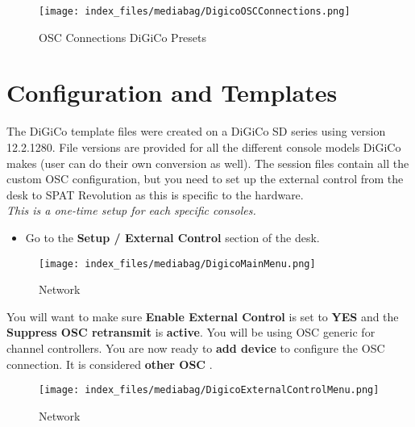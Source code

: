 \documentclass[
  letterpaper,
  DIV=11,
  numbers=noendperiod]{scrreport}
\providecommand{\tightlist}{%
  \setlength{\itemsep}{0pt}\setlength{\parskip}{0pt}}\usepackage{longtable,booktabs,array}
\begin{document}
\begin{figure}

{\centering \texttt{[image: index\_files/mediabag/DigicoOSCConnections.png]}

}

\caption{OSC Connections DiGiCo Presets}

\end{figure}

\hypertarget{configuration-and-templates}{%
\section{Configuration and
Templates}\label{configuration-and-templates}}

The DiGiCo template files were created on a DiGiCo SD series using
version 12.2.1280. File versions are provided for all the different
console models DiGiCo makes (user can do their own conversion as well).
The session files contain all the custom OSC configuration, but you need
to set up the external control from the desk to SPAT Revolution as this
is specific to the hardware.\\
\emph{This is a one-time setup for each specific consoles.}

\begin{itemize}
\tightlist
\item
  Go to the \textbf{Setup / External Control} section of the desk.
\end{itemize}

\begin{figure}

{\centering \texttt{[image: index\_files/mediabag/DigicoMainMenu.png]}

}

\caption{Network}

\end{figure}

You will want to make sure \textbf{Enable External Control} is set to
\textbf{YES} and the \textbf{Suppress OSC retransmit} is
\textbf{active}. You will be using OSC generic for channel controllers.
You are now ready to \textbf{add device} to configure the OSC
connection. It is considered \textbf{other OSC} .

\begin{figure}

{\centering \texttt{[image: index\_files/mediabag/DigicoExternalControlMenu.png]}

}

\caption{Network}

\end{figure}
\end{document}
